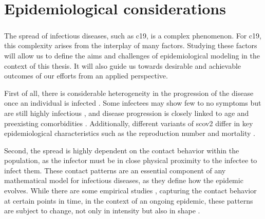 \glsresetall
\chapter{Epidemiological considerations}
\label{chap:epidemiological_considerations}
\begin{tcolorbox}[title={Contributions of this chapter}]
    
    \paragraph{}

    \paragraph{}

    \paragraph{}

    \paragraph{}

\end{tcolorbox}
\newpage

The spread of infectious diseases, such as \acrshort{c19}, is a complex phenomenon. For \acrshort{c19}, this complexity arises from the interplay of many factors. Studying these factors will allow us to define the aims and challenges of epidemiological modeling in the context of this thesis. It will also guide us towards desirable and achievable outcomes of our efforts from an applied perspective.

First of all, there is considerable heterogeneity in the progression of the disease once an individual is infected \citep{Salzberger2021Epidemiology}. Some infectees may show few to no symptoms but are still highly infectious \citep{Byambasuren2020Estimating}, and disease progression is closely linked to age and preexisting comorbidities \citep{Biswas2020Association}. Additionally, different variants of \acrshort{scov2} differ in key epidemiological characteristics such as the reproduction number \citep{Du2022Reproduction} and mortality \citep{Hughes2023Effect}. 

Second, the spread is highly dependent on the contact behavior within the population, as the infector must be in close physical proximity to the infectee to infect them. These contact patterns are an essential component of any mathematical model for infectious diseases, as they define how the epidemic evolves. While there are some empirical studies \citep{Tomori2021Individual,Mossong2008Social}, capturing the contact behavior at certain points in time, in the context of an ongoing epidemic, these patterns are subject to change, not only in intensity but also in shape \citep{Tomori2021Individual}. %

